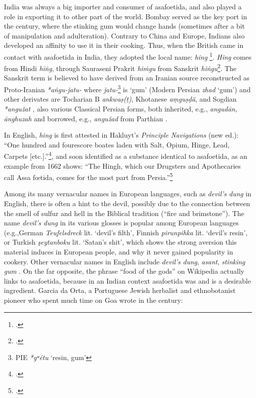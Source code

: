 

India was always a big importer and consumer of asafoetida, and also played a role in exporting it to other part of the world. Bombay served as the key port in the  century, where the stinking gum would change hands (sometimes after a bit of manipulation and adulteration). Contrary to China and Europe, Indians also developed an affinity to use it in their cooking. Thus, when the British came in contact with asafoetida in India, they adopted the local name: \textit{hing} \footcite[see][p. 418, ]{yule_hobson-jobson_1903}. \textit{Hing} comes from Hindi  
\textit{hīṅg}, through Sauraseni Prakrit \textit{hiṁgu} from Sanskrit 
\textit{hiṅgu}\footcite[hing]{ahd}. The Sanskrit term is believed to have derived from an Iranian source reconstructed as Proto-Iranian \textit{*aṅgu-ǰatu-} where \textit{ǰatu-}\footnote{\gls{PIE} \textit{*gʷétu} `resin, gum'} is `gum' (Modern Persian  \textit{zhad} `gum') and other derivates are Tocharian B \textit{ankwaṣ(ṭ)}, Khotanese \textit{a\d{m}gu\d{s}\d{d}ä}, and Sogdian \textit{*angužat} \autocites[7]{adams_dictionary_2013}[87]{gharib_sogdian_1995}[281]{turner_comparative_1962}, also various Classical Persian forms, both inherited, e.g., \textit{angudān},  \textit{ānghuzah} and borrowed, e.g., \textit{angužad} from Parthian \autocite[438]{tremblay_irano-tocharica_2005}. 

In English, \textit{hing} is first attested in Hakluyt's \textit{Principle Navigations} (new ed.): ``One hundred and fourescore boates laden with Salt, Opium, Hinge, Lead, Carpets [etc.].''\footcite[\url{http://www.perseus.tufts.edu/hopper/searchresults?target=en&inContent=true&q=hinge&doc=Perseus\%3Atext\%3A1999.03.0070}]{hakluyt_principall_1589}, and soon identified as a substance identical to asafoetida, as an example from 1662 shows: ``The Hingh, which our Drugsters and Apothecaries call Assa fœtida, comes for the most part from Persia.''\footcite[hing, \url{https://www.oed.com/view/Entry/87092}]{oed} 

Among its many vernacular names in European languages, such as \textit{devil's dung} in English, there is often a hint to the devil, possibly due to the connection between the smell of sulfur and hell in the Biblical tradition (``fire and brimstone''). The name \textit{devil's dung} in its various glosses is popular among European languages (e.g.,German \textit{Teufelsdreck} lit. `devil's filth', Finnish \textit{pirunpihka} lit. `devil's resin', or Turkish \textit{şeytanboku} lit. `Satan's shit', which shows the strong aversion this material induces in European people, and why it never gained popularity in cookery. Other vernacular names in English include \textit{devil's dung}, \textit{asant}, \textit{stinking gum} \autocite[cf.][]{george_asafoetida_2012}. On the far opposite, the phrase ``food of the gods'' on Wikipedia actually links to asafoetida, because in an Indian context asafoetida was and is a desirable ingredient. Garcia da Orta, a Portuguese Jewish herbalist and ethnobotanist pioneer who spent much time on Goa wrote in the  century:

